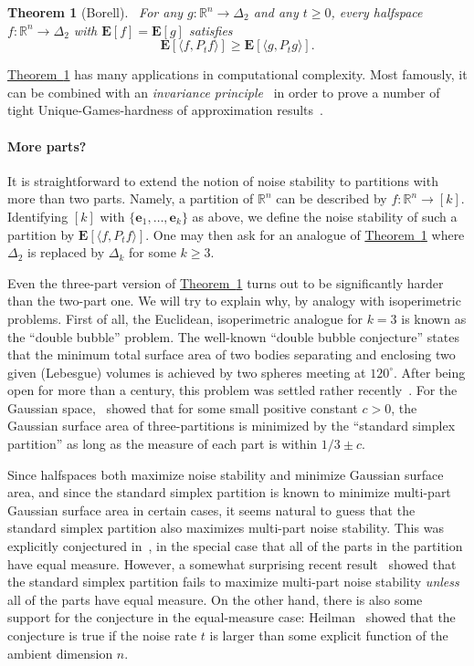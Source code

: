 \documentclass[11pt]{article}
\numberwithin{equation}{section}
\newtheorem{theorem}{Theorem}[section]
\theoremstyle{definition}
\theoremstyle{plain}
\newcommand{\R}{\mathbb R}
\newcommand{\expref}[2]{\hyperref[#2]{#1~\ref{#2}}}
\begin{document}
\begin{theorem}[Borell]~\label{thm:Borell}
For any $g: \mathbb{R}^n \rightarrow \Delta_2$ and any $t \ge 0$, every halfspace
$f: \mathbb{R}^n \rightarrow \Delta_2$ with $\mathbf{E}[f] = \mathbf{E}[g]$
satisfies 
$$
\mathbf{E}[\langle f, P_t f \rangle] \ge \mathbf{E}[\langle g, P_t g \rangle]. 
$$
\end{theorem}

\expref{Theorem}{thm:Borell} has many applications in computational complexity.
Most famously, it can be combined with an
\emph{invariance principle}~\cite{MOO10}
in order to prove a number of tight
%
%
%
%
%
%
%
Unique-Games-hardness of approximation results~\cite{KKMO04}.

\paragraph{More parts?}
It is straightforward to extend the notion of noise stability to partitions
with more than two parts. Namely, a partition of $\R^n$ can be described by $f:
\mathbb{R}^n \rightarrow [k]$. Identifying $[k]$ with $\{\mathbf{e}_1, \dots,
\mathbf{e}_k\}$ as above, we define the noise stability of such a partition by
$\mathbf{E}[\langle f, P_t f \rangle]$.
One may then ask for an analogue of \expref{Theorem}{thm:Borell} where
$\Delta_2$ is replaced by $\Delta_k$ for some $k \ge 3$.

Even the three-part version of \expref{Theorem}{thm:Borell} turns out to be
significantly harder than the two-part one. We will try to explain why, by analogy
with isoperimetric problems. First of all, the Euclidean, isoperimetric
analogue for $k=3$ is known as the ``double bubble'' problem.
The well-known  ``double bubble conjecture'' states that the minimum
total surface area of two bodies separating and enclosing two given (Lebesgue)
volumes is achieved by two spheres meeting at $120^\circ$. After being open
for more than a century, this problem was settled rather recently~\cite{HMRR:00, HMRR:02, RHLS:03, Reichardt:08}.
For the Gaussian space,~\cite{Corwin} showed that for some small  positive
constant $c>0$, the Gaussian surface area of three-partitions is minimized by
the ``standard simplex partition'' as long as the measure of each part is within $1/3 \pm c$. 

Since halfspaces both maximize noise stability and minimize Gaussian surface
area, and since the standard simplex partition is known to minimize multi-part
Gaussian surface area in certain cases, it seems natural to guess that the
standard simplex partition also maximizes multi-part noise stability.  This was
explicitly conjectured in~\cite{KKMO04}, in the special case that all of the
parts in the partition have equal measure.  However, a somewhat surprising recent result~\cite{heilman2014} showed that the standard
simplex partition fails to maximize multi-part noise stability \emph{unless}
all of the parts have equal measure.  On the other hand, there is also some
support for the conjecture in the equal-measure case: Heilman~\cite{Heilman:14}
showed that the conjecture is true if the noise rate $t$ is larger than some explicit function of the ambient dimension $n$. 
\end{document}
